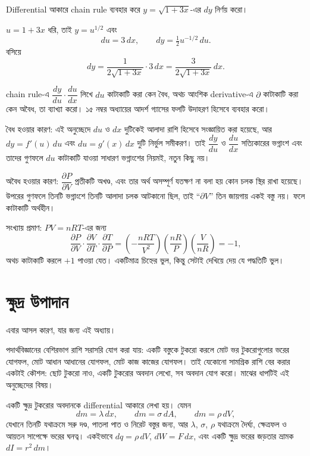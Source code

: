 \documentclass[11pt]{article}
\begin{document}
 Differential আকারে chain rule ব্যবহার করে $y = \sqrt{1+3x}$-এর $dy$
নির্ণয় করো।

\begin{sol}
$u = 1+3x$ ধরি, তাই $y = u^{1/2}$ এবং
\[
  du = 3\,dx, \qquad dy = \tfrac{1}{2}u^{-1/2}\,du .
\]
বসিয়ে
\[
  dy = \frac{1}{2\sqrt{1+3x}} \cdot 3\,dx = \frac{3}{2\sqrt{1+3x}}\,dx .
\]
\end{sol}

 chain rule-এ $\dfrac{dy}{du} \cdot \dfrac{du}{dx}$ লিখে $du$ কাটাকাটি
করা কেন বৈধ, অথচ আংশিক derivative-এ $\partial$ কাটাকাটি করা কেন অবৈধ, তা
ব্যাখ্যা করো। ১৫ নম্বর অধ্যায়ের আদর্শ গ্যাসের ফলটি উদাহরণ হিসেবে ব্যবহার
করো।

\begin{sol}
বৈধ হওয়ার কারণ: এই অনুচ্ছেদে $du$ ও $dx$ দুটিকেই আলাদা রাশি হিসেবে
সংজ্ঞায়িত করা হয়েছে, আর $dy = f'(u)\,du$ এবং $du = g'(x)\,dx$ দুটি
নির্ভুল সমীকরণ। তাই $\dfrac{dy}{du}$ ও $\dfrac{du}{dx}$ সত্যিকারের ভগ্নাংশ
এবং তাদের গুণফলে $du$ কাটাকাটি যাওয়া সাধারণ ভগ্নাংশের নিয়মই, নতুন কিছু নয়।

অবৈধ হওয়ার কারণ: $\dfrac{\partial P}{\partial V}$ প্রতীকটি অখণ্ড, এবং তার
অর্থ অসম্পূর্ণ যতক্ষণ না বলা হয় কোন চলক স্থির রাখা হয়েছে। উপরের গুণফলে
তিনটি ভগ্নাংশে তিনটি আলাদা চলক আটকানো ছিল, তাই ``$\partial V$'' তিন জায়গায়
একই বস্তু নয়। ফলে কাটাকাটি অর্থহীন।

সংখ্যায় প্রমাণ: $PV = nRT$-এর জন্য
\[
  \frac{\partial P}{\partial V}\cdot\frac{\partial V}{\partial T}\cdot
  \frac{\partial T}{\partial P}
  = \left( -\frac{nRT}{V^{2}} \right)\left( \frac{nR}{P} \right)
    \left( \frac{V}{nR} \right) = -1 ,
\]
অথচ কাটাকাটি করলে $+1$ পাওয়া যেত। একটিমাত্র চিহ্নের ভুল, কিন্তু সেটাই
দেখিয়ে দেয় যে পদ্ধতিটি ভুল।
\end{sol}

\section{ক্ষুদ্র উপাদান}

এবার আসল কারণ, যার জন্য এই অধ্যায়।

পদার্থবিজ্ঞানের বেশিরভাগ রাশি সরাসরি যোগ করা যায়: একটি বস্তুকে টুকরো করলে মোট ভর
টুকরোগুলোর ভরের যোগফল, মোট আধান আধানের যোগফল, মোট কাজ কাজের যোগফল। তাই যেকোনো
সামগ্রিক রাশি বের করার একটাই কৌশল: ছোট টুকরো নাও, একটি টুকরোর অবদান লেখো, সব অবদান
যোগ করো। মাঝের ধাপটিই এই অনুচ্ছেদের বিষয়।

\begin{idea}[ক্ষুদ্র উপাদান]
একটি ক্ষুদ্র টুকরোর অবদানকে differential আকারে লেখা হয়। যেমন
\[
  dm = \lambda\,dx, \qquad dm = \sigma\,dA, \qquad dm = \rho\,dV ,
\]
যেখানে তিনটি যথাক্রমে সরু দণ্ড, পাতলা পাত ও নিরেট বস্তুর জন্য, আর
$\lambda$, $\sigma$, $\rho$ যথাক্রমে দৈর্ঘ্য, ক্ষেত্রফল ও আয়তন সাপেক্ষে ভরের ঘনত্ব।
একইভাবে $dq = \rho\,dV$, $dW = F\,dx$, এবং একটি ক্ষুদ্র ভরের জড়তার ভ্রামক
$dI = r^{2}\,dm$।
\end{idea}
\end{document}
